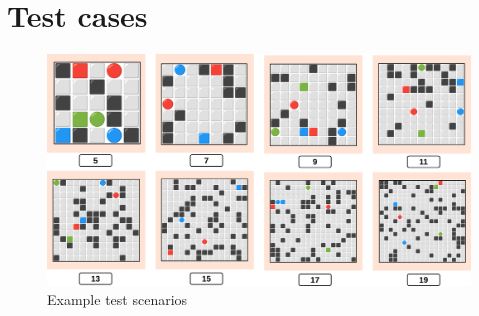 \chapter{Test cases}
\label{sec:app_04}

\begin{figure}[H]
    \centering
    \includegraphics[width=\textwidth]{pictures/test_cases.png}
    \caption{ Example test scenarios }
    \label{fig:test_cases}
\end{figure}